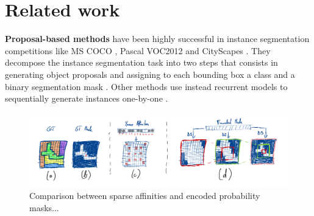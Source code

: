 
\section{Related work} \label{sec:related_work}

\textbf{Proposal-based methods} have been highly successful in instance segmentation competitions like MS COCO \cite{lin2014microsoft}, Pascal VOC2012 \cite{everingham2010pascal} and CityScapes \cite{cordts2016cityscapes}. They decompose the instance segmentation task into two steps that consists in generating object proposals and assigning to each bounding box a class and a binary segmentation mask \cite{he2017mask,porzi2019seamless,liu2018path,yang2012layered,li2017fully,ladicky2010and,hariharan2014simultaneous,chen2015multi,dai2016instance,liang2016reversible}. 
Other methods use instead recurrent models to sequentially generate instances one-by-one \cite{romera2016recurrent,ren2017end}.

\begin{figure}[t]
\centering
        \includegraphics[width=\textwidth]{./figs/masks_explained.jpg} %
        \caption{Comparison between sparse affinities and encoded probability masks...}
    \label{fig:comparing_masks_affs}
\end{figure}


